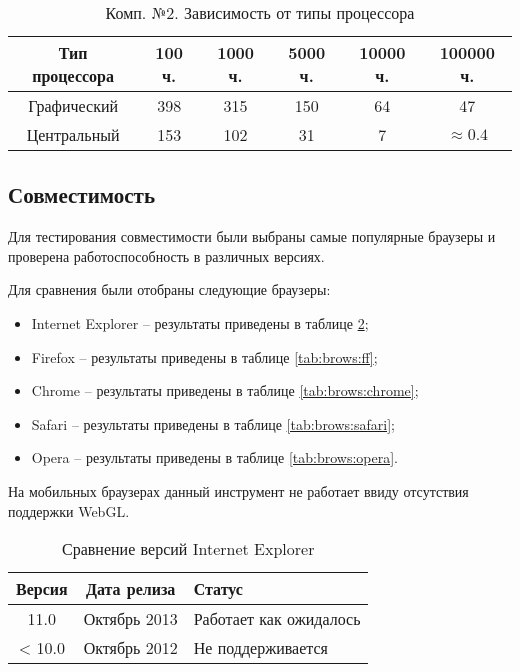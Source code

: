 \begin{table}[H]
  \caption{\label{tab:snd:cpu}Комп. №2. Зависимость от типы процессора}
  \begin{center}
    \begin{tabular}{|c|c|c|c|c|c|}
      \hline
      Тип процессора & 100 ч. & 1000 ч. & 5000 ч. & 10000 ч. & 100000 ч. \\
      \hline
      Графический & 398 & 315 & 150 & 64 & 47 \\
      Центральный & 153 & 102 & 31 & 7 & $\approx{}0.4$ \\
      \hline
    \end{tabular}
  \end{center}
\end{table}

\subsection{Совместимость}

Для тестирования совместимости были выбраны самые популярные браузеры и
проверена работоспособность в различных версиях. 

Для сравнения были отобраны следующие браузеры:

\begin{itemize}
  \item Internet Explorer -- результаты приведены в таблице \ref{tab:brows:ie};
  \item Firefox -- результаты приведены в таблице \ref{tab:brows:ff};
  \item Chrome -- результаты приведены в таблице \ref{tab:brows:chrome};
  \item Safari -- результаты приведены в таблице \ref{tab:brows:safari};
  \item Opera -- результаты приведены в таблице \ref{tab:brows:opera}.
\end{itemize}

На мобильных браузерах данный инструмент не работает ввиду отсутствия поддержки
WebGL.

\begin{table}[h!]
  \caption{\label{tab:brows:ie}Сравнение версий Internet Explorer}
  \begin{center}
    \begin{tabular}{|c|c|l|}
      \hline
      Версия & Дата релиза & Статус \\
      \hline
      11.0 & Октябрь 2013 & Работает как ожидалось \\
      < 10.0 & Октябрь 2012 & Не поддерживается \\
      \hline
    \end{tabular}
  \end{center}
\end{table}

